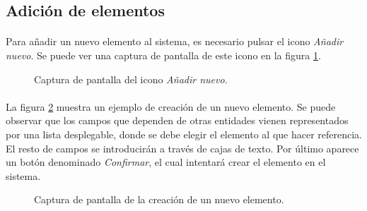 \subsection{Adición de elementos}

  \paragraph{}Para añadir un nuevo elemento al sistema, es necesario pulsar el
  icono \textit{Añadir nuevo}. Se puede ver una captura de pantalla de este
  icono en la figura \ref{capturaAddElemento}.

  \begin{figure}[!ht]
    \begin{center}
      \caption{Captura de pantalla del icono \textit{Añadir nuevo}.}
      \label{capturaAddElemento}
    \end{center}
  \end{figure}

  \paragraph{}La figura \ref{capturaAdicionElementos} muestra un ejemplo de
  creación de un nuevo elemento. Se puede observar que los campos que dependen
  de otras entidades vienen representados por una lista desplegable, donde se
  debe elegir el elemento al que hacer referencia. El resto de campos se
  introducirán a través de cajas de texto. Por último aparece un botón
  denominado \textit{Confirmar}, el cual intentará crear el elemento en el
  sistema.

  \begin{figure}[!ht]
    \begin{center}
      \caption{Captura de pantalla de la creación de un nuevo elemento.}
      \label{capturaAdicionElementos}
    \end{center}
  \end{figure}
